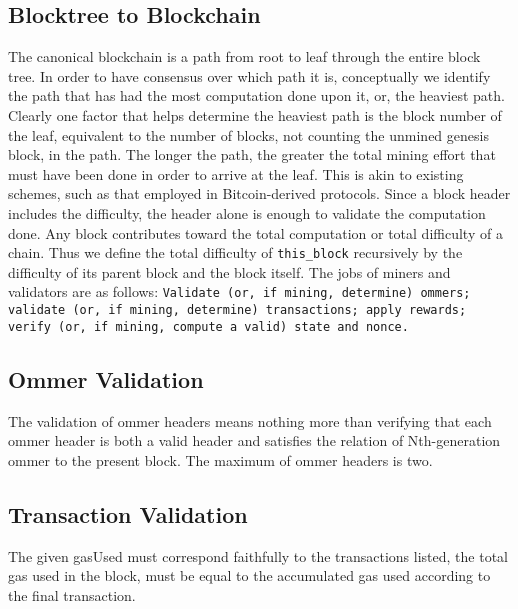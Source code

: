 \documentclass[10pt,letterpaper,leqno,bibliography=totoc]{scrartcl}
\newenvironment{alphafootnotes}
{\par\edef\savedfootnotenumber{\number\value{footnote}}
\renewcommand{\thefootnote}{\alph{footnote}}
\setcounter{footnote}{0}}
{\par\setcounter{footnote}{\savedfootnotenumber}}
\begin{document}
\begin{alphafootnotes}
\begin{multicols*}{2}
\subsection{Blocktree to Blockchain}
		
		The canonical blockchain is a path from root to leaf through the entire block tree. In order to have consensus over which path it is, conceptually we identify the path that has had the most computation done upon it, or, the heaviest path. Clearly one factor that helps determine the heaviest path is the block number of the leaf, equivalent to the number of blocks, not counting the unmined genesis block, in the path. The longer the path, the greater the total mining effort that must have been done in order to arrive at the leaf. This is akin to existing schemes, such as that employed in Bitcoin-derived protocols. Since a block header includes the difficulty, the header alone is enough to validate the computation done. Any block contributes toward the total computation or total difficulty of a chain. Thus we define the total difficulty of \texttt{this\_block} recursively by the difficulty of its parent block and the block itself.
		The jobs of miners and validators are as follows: \texttt{Validate (or, if mining, determine) ommers; validate (or, if mining, determine) transactions; apply rewards; verify (or, if mining, compute a valid) state and nonce.} 

		\subsection{Ommer Validation} The validation of ommer headers means nothing more than verifying that each ommer header is both a valid header and satisfies the relation of Nth-generation ommer to the present block. The maximum of ommer headers is two. 
		\subsection{Transaction Validation} The given gasUsed must correspond faithfully to the transactions listed, the total gas used in the block, must be equal to the accumulated gas used according to the final transaction.

\end{multicols*}
\end{alphafootnotes}
\end{document}
